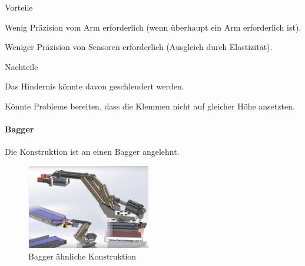 \documentclass[../main.tex]{subfiles}
\begin{document}
\begin{minipage}[t]{0.48\textwidth}
    \begin{items}
          \item [Vorteile]
          \item Wenig Präzision vom Arm erforderlich (wenn überhaupt ein Arm erforderlich ist).
          \item Weniger Präzision von Sensoren erforderlich (Ausgleich durch Elastizität).
    \end{items}
\end{minipage}
\hfill
\begin{minipage}[t]{0.48\textwidth}
    \begin{items}
          \item [Nachteile]
          \item Das Hindernis könnte davon geschleudert werden.
          \item Könnte Probleme bereiten, dass die Klemmen nicht auf gleicher Höhe ansetzten.
    \end{items}
\end{minipage}
\newpage

\paragraph{Bagger}
Die Konstruktion ist an einen Bagger angelehnt.

\begin{figure}[h!]
        \centering
        \includegraphics[width=0.48\textwidth]{img/technologierecherche/Rotation/kran.jpg}
        \caption[Bagger ähnliche Konstruktion]{Bagger ähnliche Konstruktion \footnotemark} 
        \label{img:tech_kran}
\end{figure}
\end{document}
